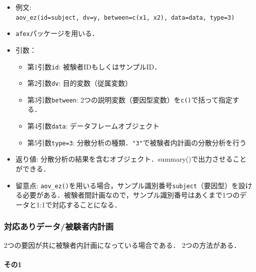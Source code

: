 \documentclass[
  xelatex, ja=standard]{bxjsarticle}
\providecommand{\tightlist}{%
  \setlength{\itemsep}{0pt}\setlength{\parskip}{0pt}}
\begin{document}
\begin{itemize}
\tightlist
\item
  例文:
  \texttt{aov\_ez(id=subject,\ dv=y,\ between=c(x1,\ x2),\ data=data,\ type=3)}
\item
  \texttt{afex}パッケージを用いる．
\item
  引数：

  \begin{itemize}
  \tightlist
  \item
    第1引数\texttt{id}: 被験者IDもしくはサンプルID．
  \item
    第2引数\texttt{dv}: 目的変数（従属変数）
  \item
    第3引数\texttt{between}:
    2つの説明変数（要因型変数）を\texttt{c()}で括って指定する．
  \item
    第4引数\texttt{data}: データフレームオブジェクト
  \item
    第5引数\texttt{type=3}:
    分散分析の種類．\texttt{"3"}で被験者内計画の分散分析を行う
  \end{itemize}
\item
  返り値:
  分散分析の結果を含むオブジェクト．summary()で出力させることができる．
\item
  留意点:
  \texttt{aov\_ez()}を用いる場合，サンプル識別番号\texttt{subject}（要因型）を設ける必要がある．被験者間計画なので，サンプル識別番号はあくまで1つのデータと1:1で対応することになる．
\end{itemize}

\subsubsection{対応ありデータ/被験者内計画}\label{ux5bfeux5fdcux3042ux308aux30c7ux30fcux30bfux88abux9a13ux8005ux5185ux8a08ux753b-1}

2つの要因が共に被験者内計画になっている場合である． 2つの方法がある．

\paragraph{その1}\label{ux305dux306e1-2}
\end{document}
